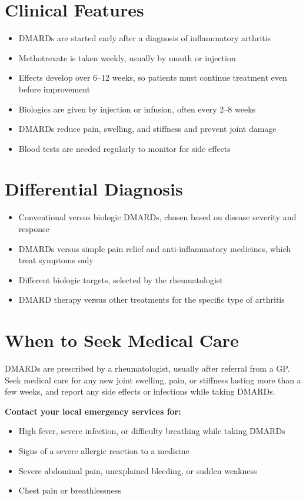 \section*{Clinical Features}
\begin{itemize}
    \item DMARDs are started early after a diagnosis of inflammatory arthritis
    \item Methotrexate is taken weekly, usually by mouth or injection
    \item Effects develop over 6--12 weeks, so patients must continue treatment even before improvement
    \item Biologics are given by injection or infusion, often every 2--8 weeks
    \item DMARDs reduce pain, swelling, and stiffness and prevent joint damage
    \item Blood tests are needed regularly to monitor for side effects
\end{itemize}

\section*{Differential Diagnosis}
\begin{itemize}
    \item Conventional versus biologic DMARDs, chosen based on disease severity and response
    \item DMARDs versus simple pain relief and anti-inflammatory medicines, which treat symptoms only
    \item Different biologic targets, selected by the rheumatologist
    \item DMARD therapy versus other treatments for the specific type of arthritis
\end{itemize}

\section*{When to Seek Medical Care}
DMARDs are prescribed by a rheumatologist, usually after referral from a GP. Seek medical care for any new joint swelling, pain, or stiffness lasting more than a few weeks, and report any side effects or infections while taking DMARDs.

\textbf{Contact your local emergency services for:}
\begin{itemize}
    \item High fever, severe infection, or difficulty breathing while taking DMARDs
    \item Signs of a severe allergic reaction to a medicine
    \item Severe abdominal pain, unexplained bleeding, or sudden weakness
    \item Chest pain or breathlessness
\end{itemize}

